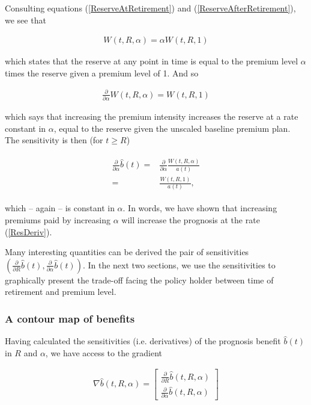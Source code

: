 \documentclass{article}
\newcommand{\1}[1]{\mathbbm{1}_{\left\lbrace #1 \right\rbrace}}
\theoremstyle{break}
\theoremstyle{remark}
\numberwithin{equation}{section}
\begin{document}
Consulting equations (\ref{ReserveAtRetirement}) and (\ref{ReserveAfterRetirement}), we see that

\begin{align*}
	W(t,R,\alpha) = \alpha W(t,R,1)
\end{align*}

which states that the reserve at any point in time is equal to the premium level $\alpha$ times the reserve given a premium level of 1. And so

\begin{align} \label{AlphaDeriv}
	\frac{\partial}{\partial \alpha }W(t,R,\alpha) = W(t,R,1)
\end{align}

which says that increasing the premium intensity increases the reserve at a rate constant in $\alpha$, equal to the reserve given the unscaled baseline premium plan. The sensitivity is then (for $t \geq R$)

\begin{align} \label{ResDeriv}
\begin{split}
		\frac{\partial}{\partial \alpha} \hat{b}(t) =& \frac{\partial}{\partial \alpha }\frac{W(t,R,\alpha)}{a(t)}\\
	=& \frac{W(t,R,1)}{a(t)},
\end{split}
\end{align}

which -- again -- is constant in $\alpha$. In words, we have shown that increasing premiums paid by increasing $\alpha$ will increase the prognosis at the rate (\ref{ResDeriv}).

\bigskip
\bigskip
\bigskip

Many interesting quantities can be derived the pair of sensitivities $(\frac{\partial}{\partial R} \hat{b}(t),\frac{\partial}{\partial \alpha} \hat{b}(t))$. In the next two sections, we use the sensitivities to graphically present the trade-off facing the policy holder between time of retirement and premium level.

\subsubsection{A contour map of benefits}

Having calculated the sensitivities (i.e. derivatives) of the prognosis benefit $\hat{b}(t)$ in $R$ and $\alpha$, we have access to the gradient

\begin{align*}
	\nabla \hat{b}(t,R,\alpha) =
	\begin{bmatrix}
		\frac{\partial}{\partial R }\hat{b}(t,R,\alpha) \\
		\frac{\partial}{\partial \alpha }\hat{b}(t,R,\alpha)
	\end{bmatrix}
\end{align*}
\end{document}
